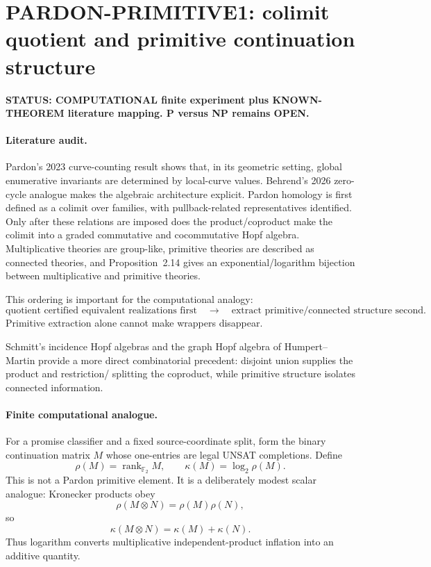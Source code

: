 \section*{PARDON-PRIMITIVE1: colimit quotient and primitive continuation structure}

\textbf{STATUS: COMPUTATIONAL finite experiment plus KNOWN-THEOREM literature mapping. P versus NP remains OPEN.}

\paragraph{Literature audit.}
Pardon's 2023 curve-counting result shows that, in its geometric setting, global enumerative
invariants are determined by local-curve values. Behrend's 2026 zero-cycle analogue makes
the algebraic architecture explicit. Pardon homology is first defined as a colimit over
families, with pullback-related representatives identified. Only after these relations are
imposed does the product/coproduct make the colimit into a graded commutative and
cocommutative Hopf algebra. Multiplicative theories are group-like, primitive theories are
described as connected theories, and Proposition~2.14 gives an exponential/logarithm
bijection between multiplicative and primitive theories.

This ordering is important for the computational analogy:
\[
\boxed{
\text{quotient certified equivalent realizations first}
\quad\longrightarrow\quad
\text{extract primitive/connected structure second}.
}
\]
Primitive extraction alone cannot make wrappers disappear.

Schmitt's incidence Hopf algebras and the graph Hopf algebra of Humpert--Martin provide a
more direct combinatorial precedent: disjoint union supplies the product and restriction/
splitting the coproduct, while primitive structure isolates connected information.

\paragraph{Finite computational analogue.}
For a promise classifier and a fixed source-coordinate split, form the binary continuation
matrix $M$ whose one-entries are legal UNSAT completions. Define
\[
\rho(M)=\operatorname{rank}_{\mathbb F_2}M,
\qquad
\kappa(M)=\log_2\rho(M).
\]
This is not a Pardon primitive element. It is a deliberately modest scalar analogue:
Kronecker products obey
\[
\rho(M\otimes N)=\rho(M)\rho(N),
\]
so
\[
\boxed{\kappa(M\otimes N)=\kappa(M)+\kappa(N)}.
\]
Thus logarithm converts multiplicative independent-product inflation into an additive quantity.

